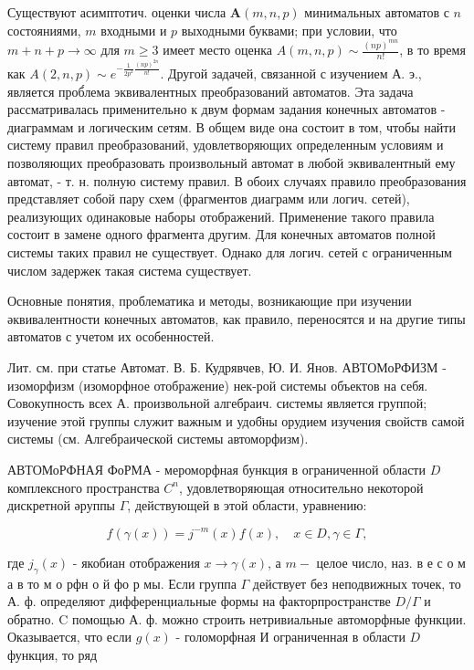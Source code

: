 \documentclass[10pt]{article}
\begin{document}
Существуют асимптотич. оценки числа $\boldsymbol{A}(m, n, p)$ минимальных автоматов с $n$ состояниями, $m$ входными и $p$ выходными буквами; при условии, что $m+n+p \rightarrow \infty$ для $m \geqslant 3$ имеет место оценка $A(m, n, p) \sim \frac{(n p)^{m n}}{n !}$, в то время как $A(2, n, p) \sim e^{-\frac{1}{2 p^{2}} \frac{(n p)^{2 n}}{n !}}$. Другой задачей, связанной с изучением А. э., является проб́лема эквивалентных преобразований автоматов. Эта задача рассматривалась применительно к двум формам задания конечных автоматов - диаграммам и логическим сетям. В общем виде она состоит в том, чтобы найти систему правил преобразований, удовлетворяющих определенным условиям и позволяющих преобразовать произвольный автомат в любой эквивалентный ему автомат, - т. н. полную систему правил. В обоих случаях правило преобразования представляет собой пару схем (фрагментов диаграмм или логич. сетей), реализующих одинаковые наборы отображений. Применение такого правила состоит в замене одного фрагмента другим. Для конечных автоматов полной системы таких правил не существует. Однако для логич. сетей с ограниченным числом задержек такая система существует.



Основные понятия, проблематика и методы, возникающие при изучении әквивалентности конечных автоматов, как правило, переносятся и на другие типы автоматов с учетом их особенностей.



Лит. см. при статье Автомат. В. Б. Кудрявчев, Ю. И. Янов. АВТОМоРФИЗМ - изоморфизм (изоморфное отображение) нек-рой системы объектов на себя. Совокупность всех А. произвольной алгебраич. системы является группой; изучение этой группы служит важным и удоб̈ны орудием изучения свойств самой системы (см. Алгебраической системы автоморфизм).



АВТОМоРФНАЯ ФоРМА - мероморфная бункция в ограниченной области $D$ комплексного пространства $C^{n}$, удовлетворяющая относительно некоторой дискретной әруппы $\Gamma$, действующей в этой области, уравнению:



\[

f(\gamma(x))=j^{-m}(x) f(x), \quad x \in D, \gamma \in \Gamma,

\]



где $j_{\gamma}(x)$ - якобиан отображения $x \rightarrow \gamma(x)$, а $m-$ целое число, наз. в е с о м а в то м о рфн о й фо р мы. Если группа $\Gamma$ действует без неподвижных точек, то А. ф. определяют дифференциальные формы на факторпространстве $D / \Gamma$ и обратно. $\mathrm{C}$ помощью А. ф. можно строить нетривиальные автоморфные функции. Оказывается, что если $g(x)$ - голоморфная И ограниченная в области $D$ функция, то ряд
\end{document}
